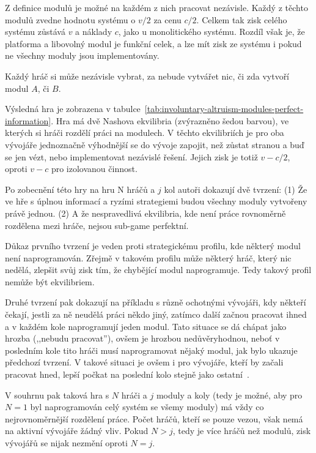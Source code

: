 \begin{multicols}{2}
	Z definice modulů je možné na každém z nich pracovat nezávisle. Každý z těchto modulů zvedne hodnotu systému o $v/2$ za cenu $c/2$. Celkem tak zisk celého systému zůstává $v$ a náklady $c$, jako u monolitického systému. Rozdíl však je, že platforma a libovolný modul je funkční celek, a lze mít zisk ze systému i pokud ne všechny moduly jsou implementovány.

	Každý hráč si může nezávisle vybrat, za nebude vytvářet nic, či zda vytvoří modul $A$, či $B$.

	Výsledná hra je zobrazena v tabulce~\ref{tab:involuntary-altruism-modules-perfect-information}. Hra má dvě Nashova ekvilibria (zvýrazněno šedou barvou), ve kterých si hráči rozdělí práci na modulech. V těchto ekvilibriích je pro oba vývojáře jednoznačně výhodnější se do vývoje zapojit, než zůstat stranou a buď se jen vézt, nebo implementovat nezávislé řešení. Jejich zisk je totiž $v - c/2$, oproti $v-c$ pro izolovanou činnost.

	Po zobecnění této hry na hru N hráčů a $j$ kol autoři dokazují dvě tvrzení: (1) Že ve hře s úplnou informací a ryzími strategiemi budou všechny moduly vytvořeny právě jednou. (2) A že nespravedlivá ekvilibria, kde není práce rovnoměrně rozdělena mezi hráče, nejsou sub-game perfektní.

	Důkaz prvního tvrzení je veden proti strategickému profilu, kde některý modul není naprogramován. Zřejmě v takovém profilu může některý hráč, který nic nedělá, zlepšit svůj zisk tím, že chybějící modul naprogramuje. Tedy takový profil nemůže být ekvilibriem.

	Druhé tvrzení pak dokazují na příkladu s různě ochotnými vývojáři, kdy někteří čekají, jestli za ně neudělá práci někdo jiný, zatímco další začnou pracovat ihned a v každém kole naprogramují jeden modul. Tato situace se dá chápat jako hrozba (,,nebudu pracovat''), ovšem je hrozbou nedůvěryhodnou, neboť v posledním kole tito hráči musí naprogramovat nějaký modul, jak bylo ukazuje předchozí tvrzení. V takové situaci je ovšem i pro vývojáře, kteří by začali pracovat hned, lepší počkat na poslední kolo stejně jako ostatní~\cite[kap. 4.1]{architecture-opensource}.

	V souhrnu pak taková hra s $N$ hráči a $j$ moduly a koly (tedy je možné, aby pro $N =1$ byl naprogramován celý systém se všemy moduly) má vždy co nejrovnoměrnější rozdělení práce. Počet hráčů, kteří se pouze vezou, však nemá na aktivní vývojáře žádný vliv. Pokud $N > j$, tedy je více hráčů než modulů, zisk vývojářů se nijak nezmění oproti $N = j$.


\end{multicols}
